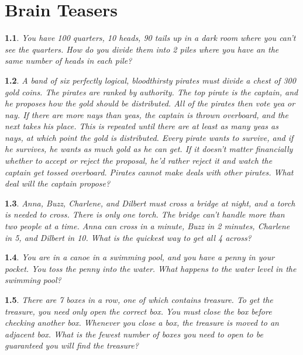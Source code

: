 \documentclass{report}
\newtheorem{problem}{}
\numberwithin{problem}{chapter} %
\begin{document}
\chapter{Brain Teasers}

\begin{problem}
You have 100 quarters, 10 heads, 90 tails up in a dark room where you can't see the quarters. How do you divide them into 2 piles where you have an the same number of heads in each pile?
\end{problem}

\begin{problem}
A band of six perfectly logical, bloodthirsty pirates must divide a chest of 300 gold coins. The pirates are ranked by authority. The top pirate is the captain, and he proposes how the gold should be distributed. All of the pirates then vote yea or nay. If there are more nays than yeas, the captain is thrown overboard, and the next takes his place. This is repeated until there are at least as many yeas as nays, at which point the gold is distributed. Every pirate wants to survive, and if he survives, he wants as much gold as he can get. If it doesn't matter financially whether to accept or reject the proposal, he'd rather reject it and watch the captain get tossed overboard. Pirates cannot make deals with other pirates. What deal will the captain propose?
\end{problem}

\begin{problem}
Anna, Buzz, Charlene, and Dilbert must cross a bridge at night, and a torch is needed to cross. There is only one torch. The bridge can't handle more than two people at a time. Anna can cross in a minute, Buzz in 2 minutes, Charlene in 5, and Dilbert in 10. What is the quickest way to get all 4 across?
\end{problem}

\begin{problem}
You are in a canoe in a swimming pool, and you have a penny in your pocket. You toss the penny into the water. What happens to the water level in the swimming pool?
\end{problem}

\begin{problem}
There are 7 boxes in a row, one of which contains treasure. To get the treasure, you need only open the correct box. You must close the box before checking another box. Whenever you close a box, the treasure is moved to an adjacent box. What is the fewest number of boxes you need to open to be guaranteed you will find the treasure?
\end{problem}
\end{document}
